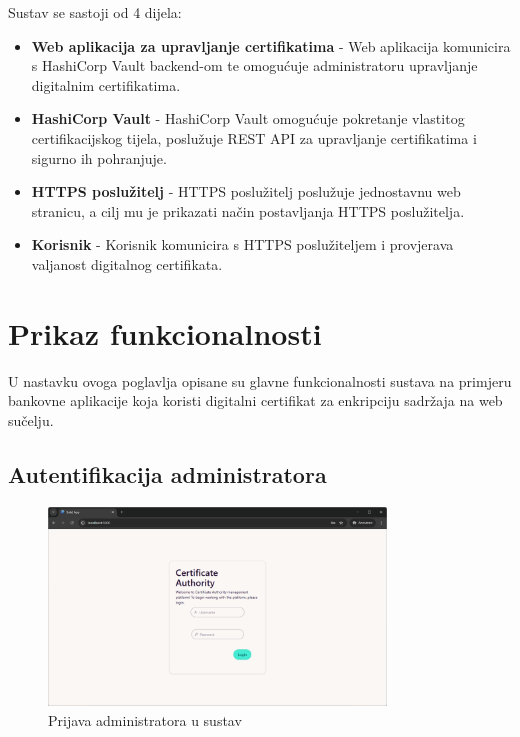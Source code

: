 \documentclass[]{foi}
\begin{document}
Sustav se sastoji od 4 dijela:
\begin{itemize}
    \item \textbf{Web aplikacija za upravljanje certifikatima} - Web aplikacija komunicira s HashiCorp Vault backend-om te omogućuje administratoru upravljanje digitalnim certifikatima.
    \item \textbf{HashiCorp Vault} - HashiCorp Vault omogućuje pokretanje vlastitog certifikacijskog tijela,
          poslužuje REST API za upravljanje certifikatima i sigurno ih pohranjuje.
    \item \textbf{HTTPS poslužitelj} - HTTPS poslužitelj poslužuje jednostavnu web stranicu, a cilj mu je prikazati način postavljanja
          HTTPS poslužitelja.
    \item \textbf{Korisnik} - Korisnik komunicira s HTTPS poslužiteljem i provjerava valjanost digitalnog certifikata.
\end{itemize}

\pagebreak

\section{Prikaz funkcionalnosti}

U nastavku ovoga poglavlja opisane su glavne funkcionalnosti sustava na primjeru bankovne aplikacije koja koristi digitalni certifikat za enkripciju sadržaja na web sučelju.

\subsection{Autentifikacija administratora}

\begin{figure}[H]
    \centering
    \includegraphics[width=0.8\textwidth]{assets/login.png}
    \caption{Prijava administratora u sustav}
\end{figure}
\end{document}

